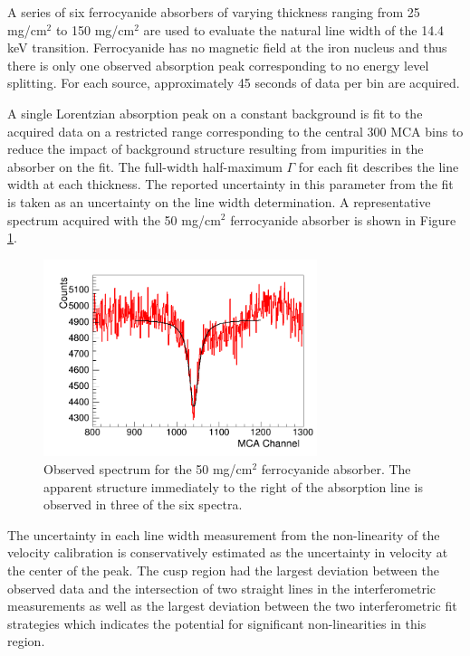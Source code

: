 A series of six ferrocyanide absorbers of varying thickness ranging from 25 mg/cm$^{2}$ to 150 mg/cm$^{2}$ are used to evaluate the natural line width of the 14.4 keV transition. Ferrocyanide has no magnetic field at the iron nucleus and thus there is only one observed absorption peak corresponding to no energy level splitting. For each source, approximately 45 seconds of data per bin are acquired. 

A single Lorentzian absorption peak on a constant background is fit to the acquired data on a restricted range corresponding to the central 300 MCA bins to reduce the impact of background structure resulting from impurities in the absorber on the fit. The full-width half-maximum $\Gamma$ for each fit describes the line width at each thickness. The reported uncertainty in this parameter from the fit is taken as an uncertainty on the line width determination. A representative spectrum acquired with the 50 mg/cm$^{2}$ ferrocyanide absorber is shown in Figure \ref{fig:cn}. 

\begin{figure}[htb]
\includegraphics[width=8cm]{linewidth22.png}
\caption{Observed spectrum for the 50 mg/cm$^{2}$ ferrocyanide absorber. The apparent structure immediately to the right of the absorption line is observed in three of the six spectra. }
\label{fig:cn}
\end{figure}

The uncertainty in each line width measurement from the non-linearity of the velocity calibration is conservatively estimated as the uncertainty in velocity at the center of the peak. The cusp region had the largest deviation between the observed data and the intersection of two straight lines in the interferometric measurements as well as the largest deviation between the two interferometric fit strategies which indicates the potential for significant non-linearities in this region. 

